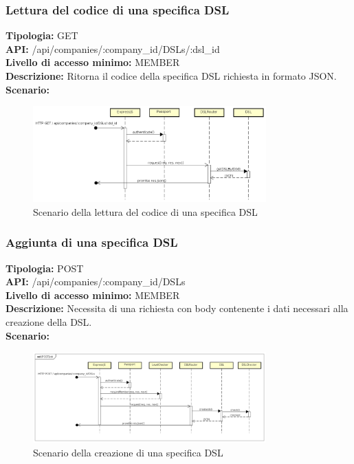 \newpage
\subsubsection{Lettura del codice di una specifica DSL}
\textbf{Tipologia:} GET \\
\textbf{API:} /api/companies/:company\_id/DSLs/:dsl\_id \\
\textbf{Livello di accesso minimo:} MEMBER \\
\textbf{Descrizione:} Ritorna il codice della specifica DSL richiesta in formato JSON. \\
\textbf{Scenario:} 
\begin{figure}[h]
\centering
\includegraphics[width=0.8\textwidth]{res/sections/backend/(GET)dslByID.png}
\caption{Scenario della lettura del codice di una specifica DSL}
\end{figure}

\newpage
\subsubsection{Aggiunta di una specifica DSL}
\textbf{Tipologia:} POST \\
\textbf{API:} /api/companies/:company\_id/DSLs \\
\textbf{Livello di accesso minimo:} MEMBER \\
\textbf{Descrizione:} Necessita di una richiesta con body contenente i dati necessari alla creazione della DSL. \\
\textbf{Scenario:} 
\begin{figure}[h]
\centering
\includegraphics[width=0.8\textwidth]{res/sections/backend/(POST)dsl.png}
\caption{Scenario della creazione di una specifica DSL}
\end{figure}

